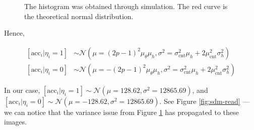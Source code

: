 \begin{figure}[h!]
  \centering

  \caption{The histogram was obtained through simulation. The red curve is the theoretical normal distribution.}
  \label{fig:sdm-read-sums}
\end{figure}

Hence,

\begin{align}
\left[ \text{acc}_i|\eta_i=1 \right] &\sim \mathcal{N}(\mu = (2p-1)^2 \mu_\theta \mu_h, \sigma^2 = \sigma_\text{cnt}^2 \mu_h + 2 \mu_\text{cnt}^2 \sigma^2_h) \label{eqn:sdm-eta1} \\
\left[ \text{acc}_i|\eta_i=0 \right] &\sim \mathcal{N}(\mu = -(2p-1)^2 \mu_\theta \mu_h, \sigma^2 = \sigma_\text{cnt}^2 \mu_h + 2 \mu_\text{cnt}^2 \sigma^2_h) \label{eqn:sdm-eta0}
\end{align}

In our case, $\left[ \text{acc}_i|\eta_i=1 \right] \sim \mathcal{N}(\mu = 128.62, \sigma^2 = 12865.69)$, and $\left[ \text{acc}_i|\eta_i=0 \right] \sim \mathcal{N}(\mu = -128.62, \sigma^2 = 12865.69)$. See Figure \ref{fig:sdm-read} --- we can notice that the variance issue from Figure \ref{fig:sdm-read-sums} has propagated to these images.


